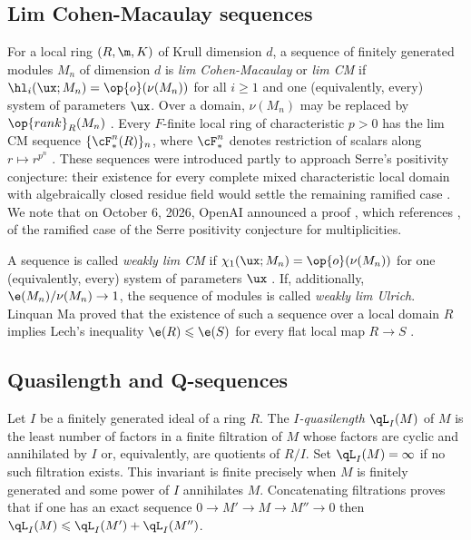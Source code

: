 \documentclass[12pt]{amsart}
\theoremstyle{plain}
\theoremstyle{remark}
\theoremstyle{definition}
\numberwithin{equation}{theorem}
\renewcommand{\geq}{\geqslant} \renewcommand{\leq}{\leqslant}
\begin{document}
\subsection{Lim Cohen-Macaulay sequences}\label{limcm}
For a local ring $(R,\m,K)$ of Krull dimension $d$, a sequence of
finitely generated modules $M_n$ of dimension $d$ is
\emph{lim Cohen-Macaulay} or \emph{lim CM} if
$\hl_i(\ux;M_n)=\op{o}(\nu(M_n))$ for all $i\geq1$ and one
(equivalently, every) system of parameters $\ux$. 
Over a domain,
$\nu(M_n)$ may be replaced by $\op{rank}_R(M_n)$
\cite[Theorems 4.6 and 4.17]{BHM26}. Every $F$-finite local ring of
characteristic $p>0$ has the lim CM sequence $\{\cF^n_*(R)\}_n$,
where $\cF^n_*$ denotes restriction of scalars along
$r\mapsto r^{p^n}$ \cite[Theorem 5.4]{BHM26}. These sequences were
introduced partly to approach Serre's positivity conjecture:
their existence for every complete mixed characteristic local
domain with algebraically closed residue 
field would settle the remaining ramified case 
\cite[\S1.6\,and\,Thm.\,6.1]{BHM26}. We note that on October 6, 2026, OpenAI 
announced a proof \cite{OpenAI26}, which references \cite{BHM26}, 
of the ramified case of the 
Serre positivity conjecture for multiplicities.

A sequence is called \emph{weakly lim CM} if
$\chi_1(\ux;M_n)=\op{o}(\nu(M_n))$ for one (equivalently, every) system of parameters 
$\ux$ \cite[Proposition~2.6]{Ma23}. If, additionally,
$\e(M_n)/\nu(M_n)\to 1$, the sequence of modules is called
\emph{weakly lim Ulrich}.
Linquan Ma proved that the existence of such a sequence over 
a local domain $R$ implies Lech's inequality $\e(R)\leq \e(S)$ 
for every flat local map $R\to S$ \cite[Definitions 2.2 and 2.9, 
Proposition 2.6, and Theorem 2.11]{Ma23}.

\subsection{Quasilength and Q-sequences}\label{QQ}
Let $I$ be a finitely generated ideal of a ring $R$. The
\emph{$I$-quasilength} $\qL_I(M)$ of $M$ is the least number of factors in
a finite filtration of $M$ whose factors are cyclic and annihilated
by $I$ or, equivalently, are quotients of $R/I$. Set
$\qL_I(M)=\infty$ if no such filtration exists. This invariant is
finite precisely when $M$ is finitely generated and some power of
$I$ annihilates $M$. Concatenating filtrations proves that if one has
an exact sequence $0\to  M'\to M \to M''\to 0$ then 
$\qL_I(M)\leq \qL_I(M')+\qL_I(M'')$.
\end{document}
